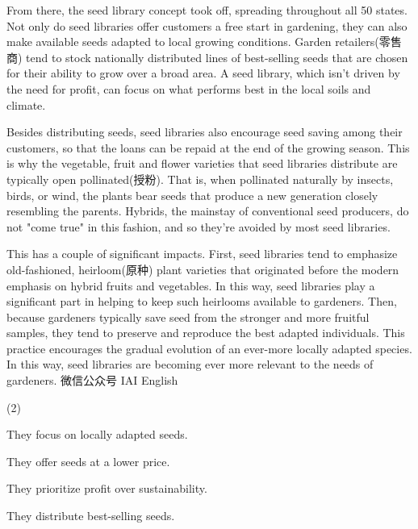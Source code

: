 \documentclass{英语试卷}
\begin{document}
\par From there, the seed library concept took off, spreading throughout all 50 states. Not only do seed libraries offer customers a free start in gardening, they can also make available seeds adapted to local growing conditions. Garden retailers(零售商) tend to stock nationally distributed lines of best-selling seeds that are chosen for their ability to grow over a broad area. A seed library, which isn't driven by the need for profit, can focus on what performs best in the local soils and climate.\par
\par Besides distributing seeds, seed libraries also encourage seed saving among their customers, so that the loans can be repaid at the end of the growing season. This is why the vegetable, fruit and flower varieties that seed libraries distribute are typically open pollinated(授粉). That is, when pollinated naturally by insects, birds, or wind, the plants bear seeds that produce a new generation closely resembling the parents. Hybrids, the mainstay of conventional seed producers, do not "come true" in this fashion, and so they're avoided by most seed libraries.\par
\par This has a couple of significant impacts. First, seed libraries tend to emphasize old-fashioned, heirloom(原种) plant varieties that originated before the modern emphasis on hybrid fruits and vegetables. In this way, seed libraries play a significant part in helping to keep such heirlooms available to gardeners. Then, because gardeners typically save seed from the stronger and more fruitful samples, they tend to preserve and reproduce the best adapted individuals. This practice encourages the gradual evolution of an ever-more locally adapted species. In this way, seed libraries are becoming ever more relevant to the needs of gardeners. 微信公众号 IAI English\par
{}
\begin{choices}(2)
  \item They focus on locally adapted seeds.
  \item They offer seeds at a lower price.
  \item They prioritize profit over sustainability.
  \item They distribute best-selling seeds.
\end{choices}
\end{document}
